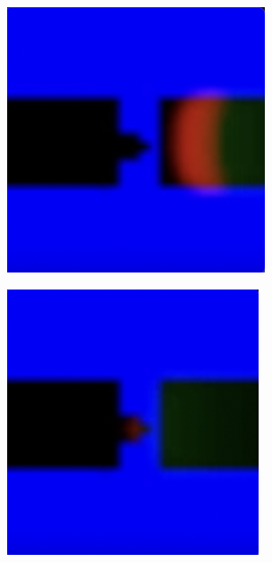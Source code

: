 \begin{figure}
	\begin{subfigure}{0.24\textwidth}
		\includegraphics[width=\linewidth]{diode/hard/Screenshot 2024-03-09 at 16.23.41.png} 
	\end{subfigure}
	\begin{subfigure}{0.24\textwidth}
		\includegraphics[width=\linewidth]{diode/hard/Screenshot 2024-03-09 at 16.23.48.png} 

\end{subfigure}
\end{figure}
